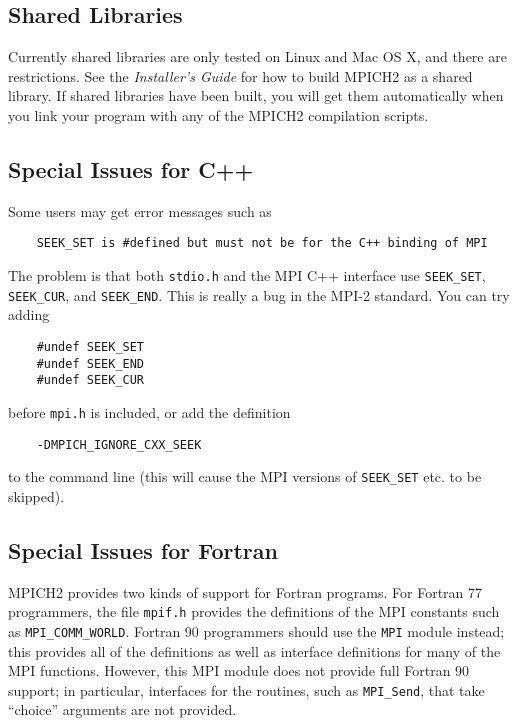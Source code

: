\documentclass[dvipdfm,11pt]{article}
\begin{document}
\subsection{Shared Libraries}
\label{sec:shared-libraries}

Currently shared libraries are only tested on Linux and Mac OS X, and there are
restrictions.  See the \emph{Installer's Guide} for how to build MPICH2
as a shared library.  If shared libraries have been built, you will
get them automatically when you link your program with any of the
MPICH2 compilation scripts.

\subsection{Special Issues for C++}
\label{sec:cxx}

Some users may get error messages such as
\begin{small}
\begin{verbatim}
    SEEK_SET is #defined but must not be for the C++ binding of MPI
\end{verbatim}
\end{small}
The problem is that both \texttt{stdio.h} and the MPI C++ interface use
\texttt{SEEK\_SET}, \texttt{SEEK\_CUR}, and \texttt{SEEK\_END}.  This is really a bug
in the MPI-2 standard.  You can try adding 
\begin{verbatim}
    #undef SEEK_SET
    #undef SEEK_END
    #undef SEEK_CUR
\end{verbatim}
before \texttt{mpi.h} is included, or add the definition
\begin{verbatim}
    -DMPICH_IGNORE_CXX_SEEK
\end{verbatim}
to the command line (this will cause the MPI versions of \texttt{SEEK\_SET}
etc. to be skipped).

\subsection{Special Issues for Fortran}
\label{sec:fortran}

MPICH2 provides two kinds of support for Fortran programs.  For
Fortran 77 programmers, the file \texttt{mpif.h} provides the
definitions of the MPI constants such as \texttt{MPI\_COMM\_WORLD}.
Fortran 90 programmers should use the \texttt{MPI} module instead;
this provides all of the definitions as well as interface definitions
for many of the MPI functions.  However, this MPI module does not
provide full Fortran 90 support; in particular, interfaces for the
routines, such as \texttt{MPI\_Send}, that take ``choice'' arguments
are not provided.
\end{document}
